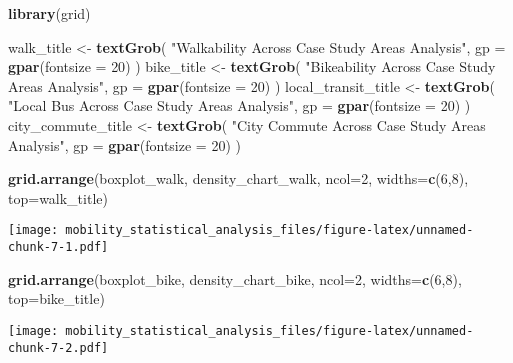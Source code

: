 \documentclass[
]{article}
\newenvironment{Shaded}{\begin{snugshade}}{\end{snugshade}}
\newcommand{\AttributeTok}[1]{\textcolor[rgb]{0.13,0.29,0.53}{#1}}
\newcommand{\DecValTok}[1]{\textcolor[rgb]{0.00,0.00,0.81}{#1}}
\newcommand{\FunctionTok}[1]{\textcolor[rgb]{0.13,0.29,0.53}{\textbf{#1}}}
\newcommand{\NormalTok}[1]{#1}
\newcommand{\OtherTok}[1]{\textcolor[rgb]{0.56,0.35,0.01}{#1}}
\newcommand{\StringTok}[1]{\textcolor[rgb]{0.31,0.60,0.02}{#1}}
\begin{document}
\begin{Shaded}
\begin{Highlighting}[]
\FunctionTok{library}\NormalTok{(grid)}

\NormalTok{walk\_title }\OtherTok{\textless{}{-}} \FunctionTok{textGrob}\NormalTok{(}
  \StringTok{"Walkability Across Case Study Areas Analysis"}\NormalTok{,}
  \AttributeTok{gp =} \FunctionTok{gpar}\NormalTok{(}\AttributeTok{fontsize =} \DecValTok{20}\NormalTok{)}
\NormalTok{)}
\NormalTok{bike\_title }\OtherTok{\textless{}{-}} \FunctionTok{textGrob}\NormalTok{(}
  \StringTok{"Bikeability Across Case Study Areas Analysis"}\NormalTok{, }
  \AttributeTok{gp =} \FunctionTok{gpar}\NormalTok{(}\AttributeTok{fontsize =} \DecValTok{20}\NormalTok{)}
\NormalTok{)}
\NormalTok{local\_transit\_title }\OtherTok{\textless{}{-}} \FunctionTok{textGrob}\NormalTok{(}
  \StringTok{"Local Bus Across Case Study Areas Analysis"}\NormalTok{,}
  \AttributeTok{gp =} \FunctionTok{gpar}\NormalTok{(}\AttributeTok{fontsize =} \DecValTok{20}\NormalTok{)}
\NormalTok{)}
\NormalTok{city\_commute\_title }\OtherTok{\textless{}{-}} \FunctionTok{textGrob}\NormalTok{(}
  \StringTok{"City Commute Across Case Study Areas Analysis"}\NormalTok{,}
  \AttributeTok{gp =} \FunctionTok{gpar}\NormalTok{(}\AttributeTok{fontsize =} \DecValTok{20}\NormalTok{)}
\NormalTok{)}

\FunctionTok{grid.arrange}\NormalTok{(boxplot\_walk, density\_chart\_walk, }\AttributeTok{ncol=}\DecValTok{2}\NormalTok{, }\AttributeTok{widths=}\FunctionTok{c}\NormalTok{(}\DecValTok{6}\NormalTok{,}\DecValTok{8}\NormalTok{), }\AttributeTok{top=}\NormalTok{walk\_title)}
\end{Highlighting}
\end{Shaded}

\texttt{[image: mobility\_statistical\_analysis\_files/figure-latex/unnamed-chunk-7-1.pdf]}

\begin{Shaded}
\begin{Highlighting}[]
\FunctionTok{grid.arrange}\NormalTok{(boxplot\_bike, density\_chart\_bike, }\AttributeTok{ncol=}\DecValTok{2}\NormalTok{, }\AttributeTok{widths=}\FunctionTok{c}\NormalTok{(}\DecValTok{6}\NormalTok{,}\DecValTok{8}\NormalTok{), }\AttributeTok{top=}\NormalTok{bike\_title)}
\end{Highlighting}
\end{Shaded}

\texttt{[image: mobility\_statistical\_analysis\_files/figure-latex/unnamed-chunk-7-2.pdf]}
\end{document}
